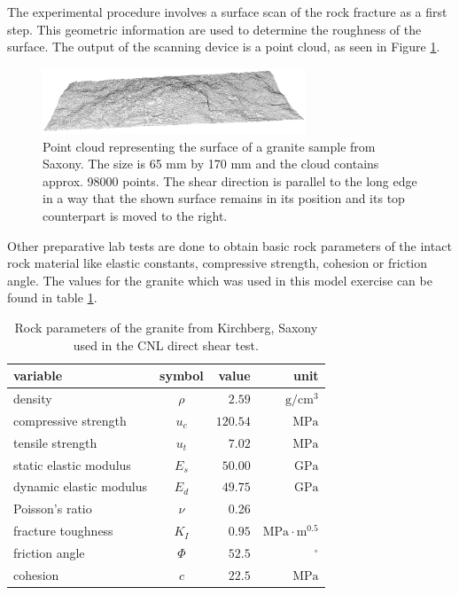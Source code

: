 The experimental procedure involves a surface scan of the rock fracture as a first step. This geometric information are used to determine the roughness of the surface. The output of the scanning device is a point cloud, as seen in Figure \ref{fig:MEX7_pointCloud}.

\begin{figure}[!ht]
\begin{center}
\includegraphics[width=0.7\textwidth]{./figures/MEX7_Point_cloud.png}
\end{center}
\caption{Point cloud representing the surface of a granite sample from Saxony. The size is 65 mm by 170 mm and the cloud contains approx. 98000 points. The shear direction is parallel to the long edge in a way that the shown surface remains in its position and its top counterpart is moved to the right.}
\label{fig:MEX7_pointCloud}
\end{figure}

Other preparative lab tests are done to obtain basic rock parameters of the intact rock material like elastic constants, compressive strength, cohesion or friction angle. The values for the granite which was used in this model exercise can be found in table \ref{table:MEX7_rockParam}.

\begin{table}
\begin{center}
\begin{tabular}{l c r r}
variable & symbol & value & unit\\
\hline
density & $\rho$ & $2.59$ &$\text{g}/\text{cm}^3$\\
compressive strength & $u_c$ & $120.54$ &$\text{MPa}   $\\
tensile strength & $u_t$ & $7.02$&$ \text{MPa}   $\\
static elastic modulus & $E_s$ & $50.00$&$ \text{GPa}   $\\
dynamic elastic modulus & $E_d$ & $49.75$&$ \text{GPa}   $\\
Poisson's ratio & $\nu$ & 0.26& \\
fracture toughness & $K_I$ & $0.95$&$\text{MPa}\cdot\text{m}^{0.5}$\\
friction angle & $\Phi$ &  $52.5$&$^\circ$\\
cohesion & $c$ &  $22.5$&$ \text{MPa}   $\\
\end{tabular}
\caption{Rock parameters of the granite from Kirchberg, Saxony used in the CNL direct shear test.}
\label{table:MEX7_rockParam}
\end{center}
\end{table}

